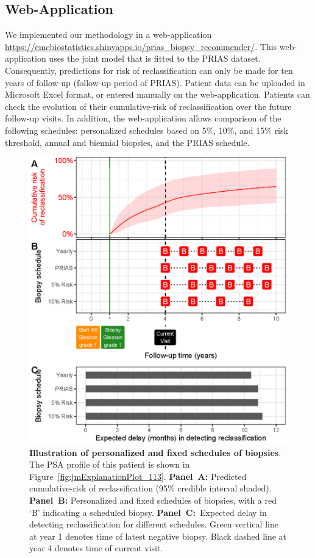 \subsection{Web-Application}
We implemented our methodology in a web-application \url{https://emcbiostatistics.shinyapps.io/prias_biopsy_recommender/}. This web-application uses the joint model that is fitted to the PRIAS dataset. Consequently, predictions for risk of reclassification can only be made for ten years of follow-up (follow-up period of PRIAS). Patient data can be uploaded in Microsoft Excel format, or entered manually on the web-application. Patients can check the evolution of their cumulative-risk of reclassification over the future follow-up visits. In addition, the web-application allows comparison of the following schedules: personalized schedules based on 5\%, 10\%, and 15\% risk threshold, annual and biennial biopsies, and the PRIAS schedule.

\begin{figure}[!htb]
\centerline{\includegraphics[width=\columnwidth]{images/demo_pat1.eps}}
\caption{\textbf{Illustration of personalized and fixed schedules of biopsies}. The PSA profile of this patient is shown in Figure~\ref{fig:jmExplanationPlot_113}. \textbf{Panel~A:} Predicted cumulative-risk of reclassification (95\% credible interval shaded). \textbf{Panel~B:} Personalized and fixed schedules of biopsies, with a red `B' indicating a scheduled biopsy. \textbf{Panel~C:}\ Expected delay in detecting reclassification for different schedules. Green vertical line at year 1 denotes time of latest negative biopsy. Black dashed line at year 4 denotes time of current visit.}
\label{fig:demo_pat1}
\end{figure}